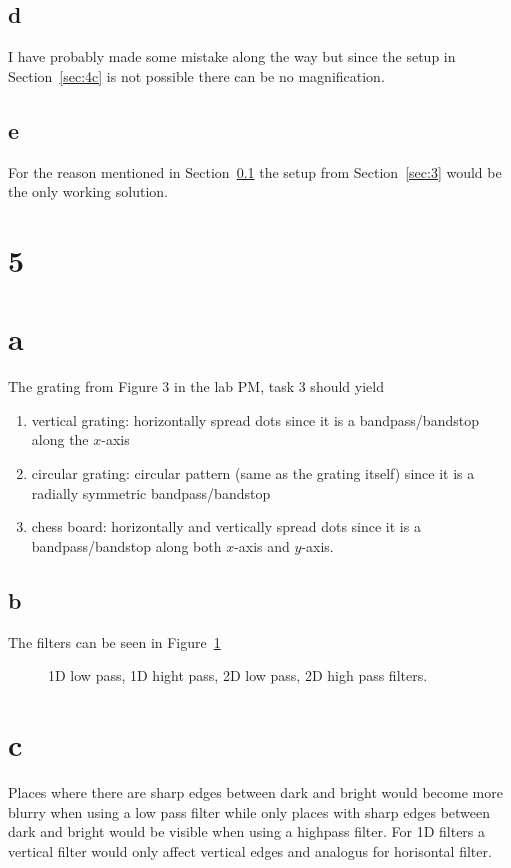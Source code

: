 \documentclass[12pt,a4paper]{article}
\begin{document}
\subsection{d}\label{sec:4d}
I have probably made some mistake along the way but since the setup in Section~\ref{sec:4c} is not possible there can be no magnification.
\subsection{e}\label{sec:4e}
For the reason mentioned in Section~\ref{sec:4d} the setup from Section~\ref{sec:3} would be the only working solution.

\section{5}
\section{a}\label{sec:5a}
The grating from Figure 3 in the lab PM, task 3 should yield
\begin{enumerate}
\item vertical grating: horizontally spread dots since it is a bandpass/bandstop along the $x$-axis
\item circular grating: circular pattern (same as the grating itself) since it is a radially symmetric bandpass/bandstop
\item chess board: horizontally and vertically spread dots since it is a bandpass/bandstop along both $x$-axis and $y$-axis.
\end{enumerate}
\subsection{b}\label{sec:5b}
The filters can be seen in Figure~\ref{fig:5b}
\begin{figure}
  \centering
  \noindent\makebox[\textwidth]{\scalebox{0.70}{}}
  \caption{1D low pass, 1D hight pass, 2D low pass, 2D high pass filters.}
  \label{fig:5b}
\end{figure}
\section{c}\label{sec:5c}
Places where there are sharp edges between dark and bright would become more blurry when using a low pass filter while only places with sharp edges between dark and bright would be visible when using a highpass filter.
For 1D filters a vertical filter would only affect vertical edges and analogus for horisontal filter.
\end{document}
